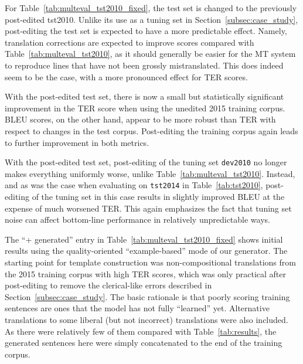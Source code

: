 {%
For Table~\ref{tab:multeval_tst2010_fixed}, the test set is changed to the previously post-edited tst2010.
Unlike its use as a tuning set in Section~\ref{subsec:case_study}, post-editing the test set is expected to have a more predictable effect.
Namely, translation corrections are expected to improve scores compared with Table~\ref{tab:multeval_tst2010}, as it should generally be easier for the MT system to reproduce lines that have not been grossly mistranslated.
This does indeed seem to be the case, with a more pronounced effect for TER scores.%


With the post-edited test set, there is now a small but statistically significant improvement in the TER score when using the unedited 2015 training corpus.
BLEU scores, on the other hand, appear to be more robust than TER with respect to changes in the test corpus.
Post-editing the training corpus again leads to further improvement in both metrics.

With the post-edited test set, post-editing of the tuning set {\small \tt dev2010} no longer makes everything uniformly worse, unlike Table~\ref{tab:multeval_tst2010}.
Instead, and as was the case when evaluating on {\small \tt tst2014} in Table~\ref{tab:tst2010}, post-editing of the tuning set in this case results in slightly improved BLEU at the expense of much worsened TER. 
This again emphasizes the fact that tuning set noise can affect bottom-line performance in relatively unpredictable ways.

The ``+ generated'' entry in Table~\ref{tab:multeval_tst2010_fixed} shows initial results using the quality-oriented ``example-based'' mode of our generator.
The starting point for template construction was non-compositional translations from the 2015 training corpus with high TER scores, which was only practical after post-editing to remove the clerical-like errors described in Section~\ref{subsec:case_study}.
The basic rationale is that poorly scoring training sentences are ones that the model has not fully ``learned'' yet.
Alternative translations to some liberal (but not incorrect) translations were also included.
As there were relatively few of them compared with Table~\ref{tab:results}, the generated sentences here were simply concatenated to the end of the training corpus.

}
